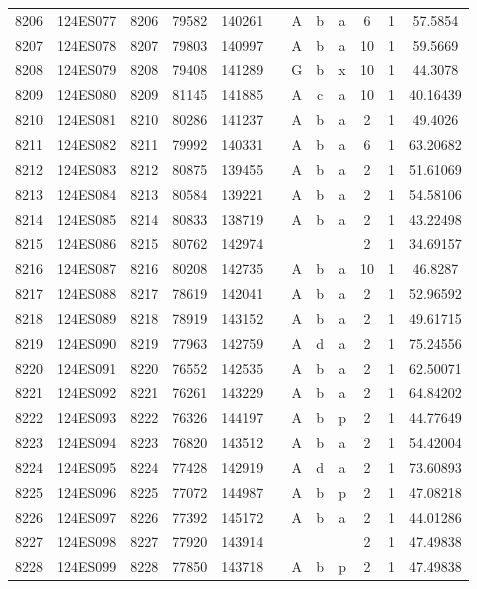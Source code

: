 \begin{tabular}{|*{12}{c|}}
8206 & 124ES077 & 8206 & 79582 & 140261 &  & A & b & a & 6 & 1 & 57.5854 \\ 
8207 & 124ES078 & 8207 & 79803 & 140997 &  & A & b & a & 10 & 1 & 59.5669 \\ 
8208 & 124ES079 & 8208 & 79408 & 141289 &  & G & b & x & 10 & 1 & 44.3078 \\ 
8209 & 124ES080 & 8209 & 81145 & 141885 &  & A & c & a & 10 & 1 & 40.16439 \\ 
8210 & 124ES081 & 8210 & 80286 & 141237 &  & A & b & a & 2 & 1 & 49.4026 \\ 
8211 & 124ES082 & 8211 & 79992 & 140331 &  & A & b & a & 6 & 1 & 63.20682 \\ 
8212 & 124ES083 & 8212 & 80875 & 139455 &  & A & b & a & 2 & 1 & 51.61069 \\ 
8213 & 124ES084 & 8213 & 80584 & 139221 &  & A & b & a & 2 & 1 & 54.58106 \\ 
8214 & 124ES085 & 8214 & 80833 & 138719 &  & A & b & a & 2 & 1 & 43.22498 \\ 
8215 & 124ES086 & 8215 & 80762 & 142974 &  &  &  &  & 2 & 1 & 34.69157 \\ 
8216 & 124ES087 & 8216 & 80208 & 142735 &  & A & b & a & 10 & 1 & 46.8287 \\ 
8217 & 124ES088 & 8217 & 78619 & 142041 &  & A & b & a & 2 & 1 & 52.96592 \\ 
8218 & 124ES089 & 8218 & 78919 & 143152 &  & A & b & a & 2 & 1 & 49.61715 \\ 
8219 & 124ES090 & 8219 & 77963 & 142759 &  & A & d & a & 2 & 1 & 75.24556 \\ 
8220 & 124ES091 & 8220 & 76552 & 142535 &  & A & b & a & 2 & 1 & 62.50071 \\ 
8221 & 124ES092 & 8221 & 76261 & 143229 &  & A & b & a & 2 & 1 & 64.84202 \\ 
8222 & 124ES093 & 8222 & 76326 & 144197 &  & A & b & p & 2 & 1 & 44.77649 \\ 
8223 & 124ES094 & 8223 & 76820 & 143512 &  & A & b & a & 2 & 1 & 54.42004 \\ 
8224 & 124ES095 & 8224 & 77428 & 142919 &  & A & d & a & 2 & 1 & 73.60893 \\ 
8225 & 124ES096 & 8225 & 77072 & 144987 &  & A & b & p & 2 & 1 & 47.08218 \\ 
8226 & 124ES097 & 8226 & 77392 & 145172 &  & A & b & a & 2 & 1 & 44.01286 \\ 
8227 & 124ES098 & 8227 & 77920 & 143914 &  &  &  &  & 2 & 1 & 47.49838 \\ 
8228 & 124ES099 & 8228 & 77850 & 143718 &  & A & b & p & 2 & 1 & 47.49838 \\ 

\end{tabular}
